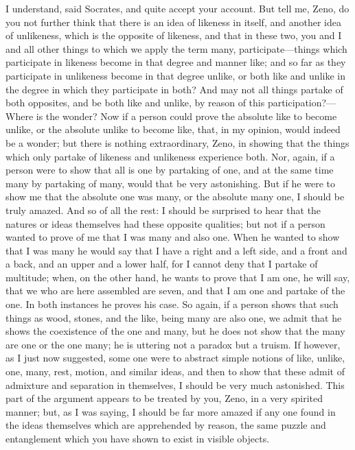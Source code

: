 \documentclass[11pt,letter]{article}
\begin{document}
\par  I understand, said Socrates, and quite accept your account. But tell me, Zeno, do you not further think that there is an idea of likeness in itself, and another idea of unlikeness, which is the opposite of likeness, and that in these two, you and I and all other things to which we apply the term many, participate—things which participate in likeness become in that degree and manner like; and so far as they participate in unlikeness become in that degree unlike, or both like and unlike in the degree in which they participate in both? And may not all things partake of both opposites, and be both like and unlike, by reason of this participation?—Where is the wonder? Now if a person could prove the absolute like to become unlike, or the absolute unlike to become like, that, in my opinion, would indeed be a wonder; but there is nothing extraordinary, Zeno, in showing that the things which only partake of likeness and unlikeness experience both. Nor, again, if a person were to show that all is one by partaking of one, and at the same time many by partaking of many, would that be very astonishing. But if he were to show me that the absolute one was many, or the absolute many one, I should be truly amazed. And so of all the rest: I should be surprised to hear that the natures or ideas themselves had these opposite qualities; but not if a person wanted to prove of me that I was many and also one. When he wanted to show that I was many he would say that I have a right and a left side, and a front and a back, and an upper and a lower half, for I cannot deny that I partake of multitude; when, on the other hand, he wants to prove that I am one, he will say, that we who are here assembled are seven, and that I am one and partake of the one. In both instances he proves his case. So again, if a person shows that such things as wood, stones, and the like, being many are also one, we admit that he shows the coexistence of the one and many, but he does not show that the many are one or the one many; he is uttering not a paradox but a truism. If however, as I just now suggested, some one were to abstract simple notions of like, unlike, one, many, rest, motion, and similar ideas, and then to show that these admit of admixture and separation in themselves, I should be very much astonished. This part of the argument appears to be treated by you, Zeno, in a very spirited manner; but, as I was saying, I should be far more amazed if any one found in the ideas themselves which are apprehended by reason, the same puzzle and entanglement which you have shown to exist in visible objects.
\end{document}
